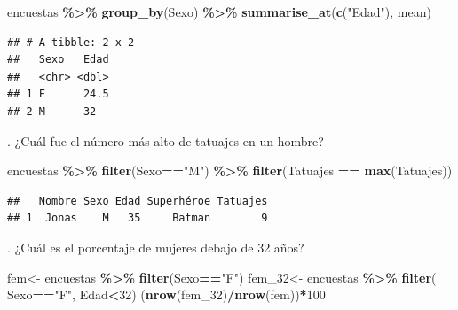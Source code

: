 \documentclass[
]{book}
\newenvironment{Shaded}{\begin{snugshade}}{\end{snugshade}}
\newcommand{\DecValTok}[1]{\textcolor[rgb]{0.00,0.00,0.81}{#1}}
\newcommand{\FunctionTok}[1]{\textcolor[rgb]{0.13,0.29,0.53}{\textbf{#1}}}
\newcommand{\NormalTok}[1]{#1}
\newcommand{\OtherTok}[1]{\textcolor[rgb]{0.56,0.35,0.01}{#1}}
\newcommand{\SpecialCharTok}[1]{\textcolor[rgb]{0.81,0.36,0.00}{\textbf{#1}}}
\newcommand{\StringTok}[1]{\textcolor[rgb]{0.31,0.60,0.02}{#1}}
\begin{document}
\begin{Shaded}
\begin{Highlighting}[]
\NormalTok{encuestas }\SpecialCharTok{\%\textgreater{}\%} \FunctionTok{group\_by}\NormalTok{(Sexo) }\SpecialCharTok{\%\textgreater{}\%} \FunctionTok{summarise\_at}\NormalTok{(}\FunctionTok{c}\NormalTok{(}\StringTok{"Edad"}\NormalTok{), mean)}
\end{Highlighting}
\end{Shaded}

\begin{verbatim}
## # A tibble: 2 x 2
##   Sexo   Edad
##   <chr> <dbl>
## 1 F      24.5
## 2 M      32
\end{verbatim}

\hfill{}.
¿Cuál fue el número más alto de tatuajes en un hombre?\\

\begin{Shaded}
\begin{Highlighting}[]
\NormalTok{encuestas }\SpecialCharTok{\%\textgreater{}\%} \FunctionTok{filter}\NormalTok{(Sexo}\SpecialCharTok{==}\StringTok{"M"}\NormalTok{) }\SpecialCharTok{\%\textgreater{}\%} \FunctionTok{filter}\NormalTok{(Tatuajes }\SpecialCharTok{==} \FunctionTok{max}\NormalTok{(Tatuajes)) }
\end{Highlighting}
\end{Shaded}

\begin{verbatim}
##   Nombre Sexo Edad Superhéroe Tatuajes
## 1  Jonas    M   35     Batman        9
\end{verbatim}

\hfill{}.
¿Cuál es el porcentaje de mujeres debajo de 32 años?\\

\begin{Shaded}
\begin{Highlighting}[]
\NormalTok{fem}\OtherTok{\textless{}{-}}\NormalTok{ encuestas }\SpecialCharTok{\%\textgreater{}\%} \FunctionTok{filter}\NormalTok{(Sexo}\SpecialCharTok{==}\StringTok{"F"}\NormalTok{)}
\NormalTok{fem\_32}\OtherTok{\textless{}{-}}\NormalTok{ encuestas }\SpecialCharTok{\%\textgreater{}\%} \FunctionTok{filter}\NormalTok{( Sexo}\SpecialCharTok{==}\StringTok{"F"}\NormalTok{, Edad}\SpecialCharTok{\textless{}}\DecValTok{32}\NormalTok{)}
\NormalTok{(}\FunctionTok{nrow}\NormalTok{(fem\_32)}\SpecialCharTok{/}\FunctionTok{nrow}\NormalTok{(fem))}\SpecialCharTok{*}\DecValTok{100}
\end{Highlighting}
\end{Shaded}
\end{document}
